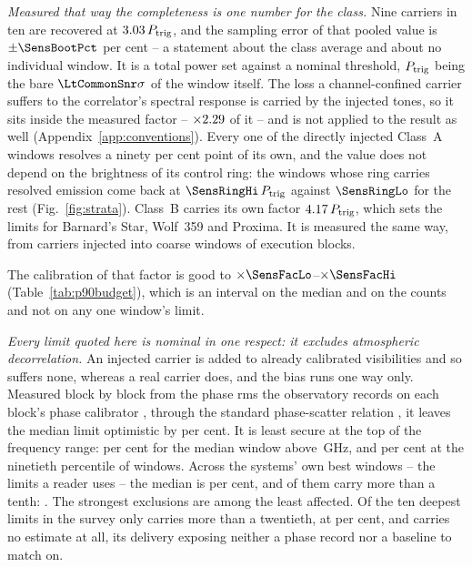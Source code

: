\emph{Measured that way the completeness is one number for the class.} Nine
carriers in ten are recovered at $3.03\,P_{\rm trig}$, and the
sampling error of that pooled value is $\pm\SensBootPct$ per cent -- a
statement about the class average and about no individual window. It is a
total power set against a nominal threshold, $P_{\rm trig}$ being the bare
$\LtCommonSnr\sigma$ of the window itself. The loss a channel-confined
carrier suffers to the correlator's spectral response is carried by the
injected tones, so it sits inside the measured factor -- $\times2.29$
of it -- and is not applied to the result as well
(Appendix~\ref{app:conventions}). Every one of the \SensNInj{} directly
injected Class~A windows resolves a ninety per cent point of its own, and the
value does not depend on the brightness of its control ring: the
\SensNRingHi{} windows whose ring carries resolved emission come back at
$\SensRingHi\,P_{\rm trig}$ against $\SensRingLo$ for the rest
(Fig.~\ref{fig:strata}). Class~B carries its own factor $4.17\,P_{\rm trig}$, which
sets the limits for Barnard's Star, Wolf~359 and Proxima. It is measured the
same way, from \SensNToneCoarse{} carriers injected into \SensNInjCoarse{}
coarse windows of \SensNInjCoarseBlock{} execution blocks.

The calibration of that factor is good to
$\times\SensFacLo$--$\times\SensFacHi$ (Table~\ref{tab:p90budget}), which is
an interval on the median and on the counts and not on any one window's
limit.

\emph{Every limit quoted here is nominal in one respect: it excludes
atmospheric decorrelation.} An injected carrier is added to already
calibrated visibilities and so suffers none, whereas a real carrier does, and
the bias runs one way only. Measured block by block from the phase rms the
observatory records on each block's phase calibrator
\citep[\S\S10.4.11, 11.3.1]{ALMAHandbook}, through the standard phase-scatter
relation \citep[Eq.~3]{Richards2022}, it leaves the median limit optimistic
by \SensDecorPct{} per cent. It is least secure at the top of the frequency
range: \SensDecorHiPct{} per cent for the median window above
\SensDecorHiGHz\,GHz, and \NmDecHiPct{} per cent at the ninetieth percentile
of windows. Across the systems' own best windows -- the limits a reader uses
-- the median is \NmDecSysMedPct{} per cent, and \NmDecNBigSys{} of them
carry more than a tenth: \NmDecBigSys. The strongest exclusions are among the
least affected. Of the ten deepest limits in the survey only
\NmDecDeepBigSys{} carries more than a twentieth, at \NmDecDeepBigPct{} per
cent, and \NmDecNoRecSys{} carries no estimate at all, its delivery exposing
neither a phase record nor a baseline to match on.

